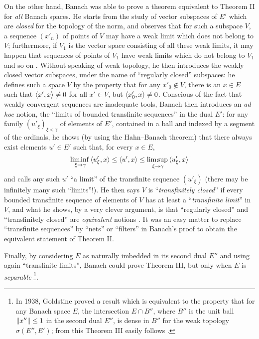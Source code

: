 \documentclass[12pt,a4paper,leqno,twoside]{extbook}
\DeclareMathOperator*{\Liminf}{lim. \! inf \,}
\DeclareMathOperator*{\Limsup}{lim. \! sup \,}
\DeclarePairedDelimiter{\norm}{\lVert}{\rVert}
\DeclarePairedDelimiter{\ip}{\langle}{\rangle}
\begin{document}
On the other hand, Banach was able to prove a theorem equivalent to Theorem II for \emph{all} Banach spaces. He starts from the study of vector subspaces of \(E'\) which are \emph{closed} for the topology of the norm, and observes that for such a subspace \(V\), a sequence \((x'_n)\) of points of \(V\) may have a weak limit which does not belong to \(V\); furthermore, if \(V_1\) is the vector space consisting of all these weak limits, it may happen that sequences of points of \(V_1\) have weak limits which do not belong to \(V_1\) and so on \cite[p.~209]{015}. Without speaking of weak topology, he then introduces the weakly closed vector subspaces, under the name of ``regularly closed'' subspaces: he defines such a space \(V\) by the property that for any \(x'_0 \not\in V\), there is an \(x \in E\) such that \(\ip{x',x} \neq 0\) for all \(x' \in V\), but \(\ip{x'_0, x} \neq 0\). Conscious of the fact that weakly convergent sequences are inadequate tools, Banach then introduces an \emph{ad hoc} notion, the ``limits of bounded transfinite sequences'' in the dual \(E'\): for any family \((u'_\xi)_{\xi < \gamma}\) of elements of \(E'\), contained in a ball and indexed by a segment of the ordinals, he shows (by using the Hahn--Banach theorem) that there always exist elements \(u' \in E'\) such that, for every \(x \in E\),
\[
    \Liminf_{\xi \to \gamma} \ip{u'_\xi, x} \leq \ip{u', x} \leq \Limsup_{\xi \to \gamma} \ip{u'_\xi, x}
\]
and calls any such \(u'\) ``a limit'' of the transfinite sequence \((u'_\xi)\) (there may be infinitely many such ``limits''!). He then says \(V\) is ``\emph{transfinitely closed}'' if every bounded transfinite sequence of elements of \(V\) has at least a ``\emph{transfinite limit}'' in \(V\), and what he shows, by a very clever argument, is that ``regularly closed'' and ``transfinitely closed'' are \emph{equivalent} notions \cite[p.~121]{015}. It was an easy matter to replace ``transfinite sequences'' by ``nets'' or ``filters'' in Banach's proof to obtain the equivalent statement of Theorem II.

Finally, by considering \(E\) as naturally imbedded in its second dual \(E''\) and using again ``transfinite limits'', Banach could prove Theorem III, but only when \(E\) is \emph{separable} \footnote{In 1938, Goldstine proved a result which is equivalent to the property that for any Banach space \(E\), the intersection \(E \cap B''\), where \(B''\) is the unit ball \(\norm{x''} \leq 1\) in the second dual \(E''\), is dense in \(B''\) for the weak topology \(\sigma(E'',E')\); from this Theorem III easily follows \cite{088}.}.
\end{document}
